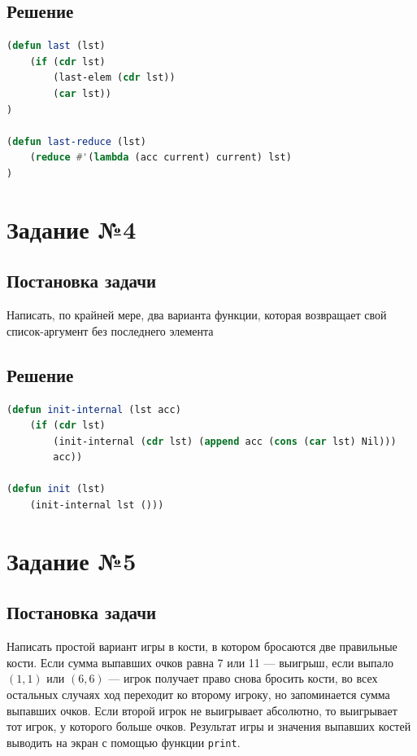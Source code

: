\documentclass[12pt]{report}
\begin{document}
\subsection*{Решение}
\begin{lstlisting}[label=third,caption=Решение задания №3, language=lisp]
(defun last (lst)
	(if (cdr lst)
		(last-elem (cdr lst))
		(car lst))
)

(defun last-reduce (lst)
	(reduce #'(lambda (acc current) current) lst)
)
\end{lstlisting}

\section*{Задание №4}
\subsection*{Постановка задачи}
Написать, по крайней мере, два варианта функции, которая возвращает свой список-аргумент без последнего элемента

\subsection*{Решение}
\begin{lstlisting}[label=third,caption=Решение задания №3, language=lisp]
(defun init-internal (lst acc)
	(if (cdr lst)
		(init-internal (cdr lst) (append acc (cons (car lst) Nil)))
		acc))

(defun init (lst)
	(init-internal lst ()))
\end{lstlisting}

\section*{Задание №5}
\subsection*{Постановка задачи}
Написать простой вариант игры в кости, в котором бросаются две правильные кости. Если сумма выпавших очков равна 7 или 11 --- выигрыш, если выпало $(1, 1)$ или $(6, 6)$ --- игрок получает право снова бросить кости, во всех остальных случаях ход переходит ко второму игроку, но запоминается сумма выпавших очков. Если второй игрок не выигрывает абсолютно, то выигрывает тот игрок, у которого больше очков. Результат игры и значения выпавших костей выводить на экран с помощью функции \texttt{print}.
\end{document}
